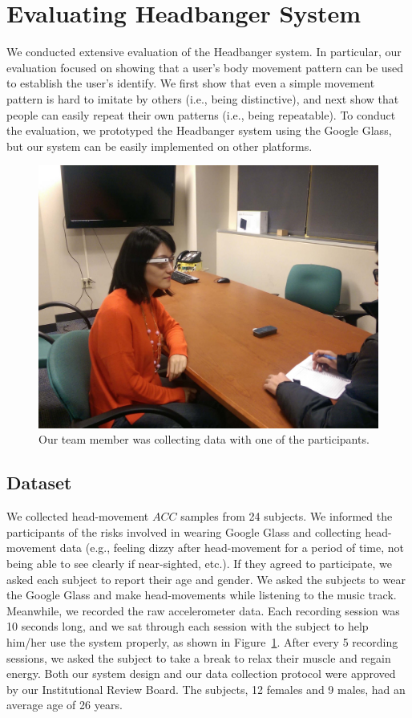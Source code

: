 \section{Evaluating Headbanger System}\label{sec:results}

We conducted extensive evaluation of the Headbanger system. In particular, our evaluation focused on showing that a user's body movement pattern can be used to establish the user's identify. We first show that even a simple movement pattern is hard to imitate by others (i.e., being distinctive), and next show that people can easily repeat their own patterns (i.e., being repeatable). To conduct the evaluation, we prototyped the Headbanger system using the Google Glass, but our system can be easily implemented on other platforms.

\begin{figure}[t]
\centering
\includegraphics [width=.75\columnwidth]{fig/exp.pdf}
\caption{Our team member was collecting data with one of the participants. \label{fig:exp}}
\end{figure}


\subsection{Dataset}

We collected head-movement $ACC$ samples from 24 subjects. We informed the participants of the risks involved in wearing Google Glass and collecting head-movement data (e.g., feeling dizzy after head-movement for a period of time, not being able to see clearly if near-sighted, etc.). If they agreed to participate, we asked each subject to report their age and gender. We asked the subjects to wear the Google Glass and make head-movements while listening to the music track. Meanwhile, we recorded the raw accelerometer data.  Each recording session was 10 seconds long, and we sat through each session with the subject to help him/her use the system properly, as shown in Figure~\ref{fig:exp}. After every 5 recording sessions, we asked the subject to take a break to relax their muscle and regain energy. Both our system design and our data collection protocol were approved by our Institutional Review Board. The subjects, 12 females and 9 males, had an average age of 26 years.

